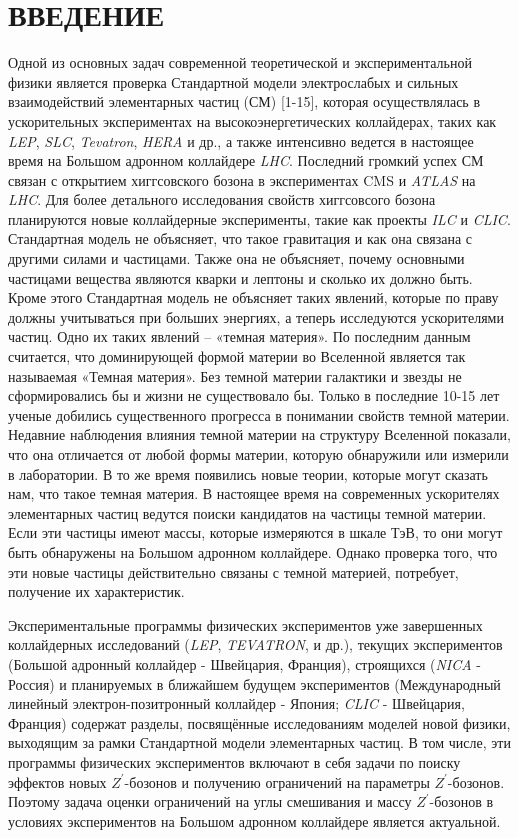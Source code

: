 \chapter*{ВВЕДЕНИЕ}
Одной из основных задач современной теоретической и экспериментальной физики является проверка Стандартной модели электрослабых и сильных взаимодействий элементарных частиц (СМ) [1-15], которая осуществлялась в ускорительных экспериментах на высокоэнергетических коллайдерах, таких как \textit{LEP}, \textit{SLC}, \textit{Tevatron}, \textit{HERA} и др., а также интенсивно ведется в настоящее время на Большом адронном коллайдере \textit{LHC}. Последний громкий успех СМ связан с открытием хиггсовского бозона в экспериментах CMS и \textit{ATLAS} на \textit{LHC}. Для более детального исследования свойств хиггсовсого бозона планируются новые коллайдерные эксперименты, такие как проекты \textit{ILC} и \textit{CLIC}. Стандартная модель не объясняет, что такое гравитация и как она связана с другими силами и частицами. Также она не объясняет, почему основными частицами вещества являются кварки и лептоны и сколько их должно быть. Кроме этого Стандартная модель не объясняет таких явлений, которые по праву должны учитываться при больших энергиях, а теперь исследуются ускорителями частиц. Одно их таких явлений – «темная материя». По последним данным считается, что доминирующей формой материи во Вселенной является так называемая «Темная материя». Без темной материи галактики и звезды не сформировались бы и жизни не существовало бы. Только в последние 10-15 лет ученые добились существенного прогресса в понимании свойств темной материи. Недавние наблюдения влияния темной материи на структуру Вселенной показали, что она отличается от любой формы материи, которую обнаружили или измерили в лаборатории. В то же время появились новые теории, которые могут сказать нам, что такое темная материя. В настоящее время на современных ускорителях элементарных частиц ведутся поиски кандидатов на частицы темной материи. Если эти частицы имеют массы, которые измеряются в шкале ТэВ, то они могут быть обнаружены на Большом адронном коллайдере. Однако проверка того, что эти новые частицы действительно связаны с темной материей, потребует, получение их характеристик.

Экспериментальные программы физических экспериментов уже завершенных коллайдерных исследований (\textit{LEP}, \textit{TEVATRON}, и др.), текущих экспериментов (Большой адронный коллайдер - Швейцария, Франция), строящихся (\textit{NICA} - Россия) и планируемых в ближайшем будущем экспериментов (Международный линейный электрон-позитронный коллайдер - Япония; \textit{CLIC} - Швейцария, Франция) содержат разделы, посвящённые исследованиям моделей новой физики, выходящим за рамки Стандартной модели элементарных частиц. В том числе, эти программы физических экспериментов включают в себя задачи по поиску эффектов новых ${Z}^{\prime}$-бозонов и получению ограничений на параметры ${Z}^{\prime}$-бозонов. Поэтому задача оценки ограничений на углы смешивания и массу ${Z}^{\prime}$-бозонов в условиях экспериментов на Большом адронном коллайдере является актуальной.


